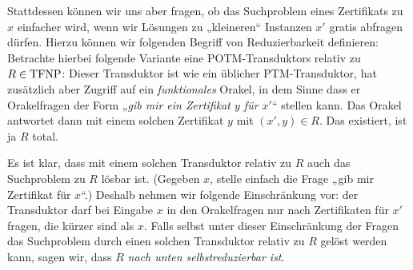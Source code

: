 Stattdessen können wir uns aber fragen, ob das Suchproblem eines Zertifikats zu $x$ einfacher wird, wenn wir Lösungen zu „kleineren“ Instanzen $x'$ gratis abfragen dürfen.
Hierzu können wir folgenden Begriff von Reduzierbarkeit definieren:
Betrachte hierbei folgende Variante eine POTM-Transduktors relativ zu $R\in\mathrm{TFNP}$: Dieser Transduktor ist wie ein üblicher PTM-Transduktor, hat zusätzlich aber Zugriff auf ein \emph{funktionales} Orakel, in dem Sinne dass er Orakelfragen der Form „\emph{gib mir ein Zertifikat $y$ für $x'$}“ stellen kann. Das Orakel antwortet dann mit einem solchen Zertifikat $y$ mit $(x', y)\in R$. Das existiert, ist ja $R$ total. 

Es ist klar, dass mit einem solchen Transduktor relativ zu $R$ auch das Suchproblem zu $R$ lösbar ist. (Gegeben $x$, stelle einfach die Frage „gib mir Zertifikat für $x$“.) Deshalb nehmen wir folgende Einschränkung vor: der Transduktor darf bei Eingabe $x$ in den Orakelfragen nur nach Zertifikaten für $x'$ fragen, die kürzer sind als $x$.
Falls selbst unter dieser Einschränkung der Fragen das Suchproblem durch einen solchen Transduktor relativ zu $R$ gelöst werden kann, sagen wir, dass $R$ \emph{nach unten selbstreduzierbar ist}.

